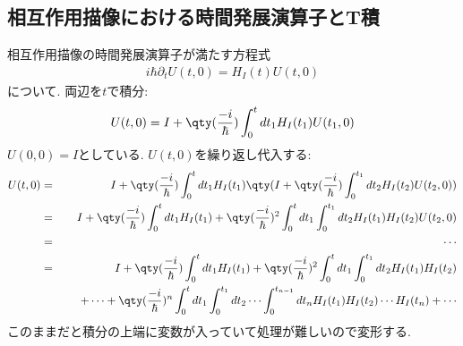 \subsection{相互作用描像における時間発展演算子とT積}
相互作用描像の時間発展演算子が満たす方程式
\begin{eqnarray}
  i\hbar\partial_tU(t, 0)= H_I(t)U(t, 0)
\end{eqnarray}
について. 両辺を$t$で積分:
\begin{eqnarray}
  U(t, 0) = I + \qty(\frac{-i}{\hbar})\int_0^t dt_1 H_I(t_1)U(t_1, 0)
\end{eqnarray}
$U(0, 0) = I$としている. $U(t, 0)$を繰り返し代入する:
\begin{eqnarray}
  U(t, 0) &=& I + \qty(\frac{-i}{\hbar})\int_0^t dt_1 H_I(t_1)\qty(I + \qty(\frac{-i}{\hbar})\int_0^{t_1} dt_2 H_I(t_2)U(t_2, 0))\\
  &=& I + \qty(\frac{-i}{\hbar})\int_0^t dt_1 H_I(t_1) + \qty(\frac{-i}{\hbar})^2\int_0^t dt_1 \int_0^{t_1} dt_2 H_I(t_1)H_I(t_2)U(t_2, 0)\\
  \nonumber  &=& \cdots\\
  \nonumber&=& I + \qty(\frac{-i}{\hbar})\int_0^t dt_1 H_I(t_1) + \qty(\frac{-i}{\hbar})^2\int_0^t dt_1 \int_0^{t_1} dt_2 H_I(t_1)H_I(t_2)\\
  && \hspace{0.5cm}+ \cdots + \qty(\frac{-i}{\hbar})^n\int_0^t dt_1 \int_0^{t_1} dt_2\cdots\int_0^{t_{n-1}} dt_n H_I(t_1)H_I(t_2)\cdots H_I(t_n) + \cdots\label{T-product0}
\end{eqnarray}
このままだと積分の上端に変数が入っていて処理が難しいので変形する.


